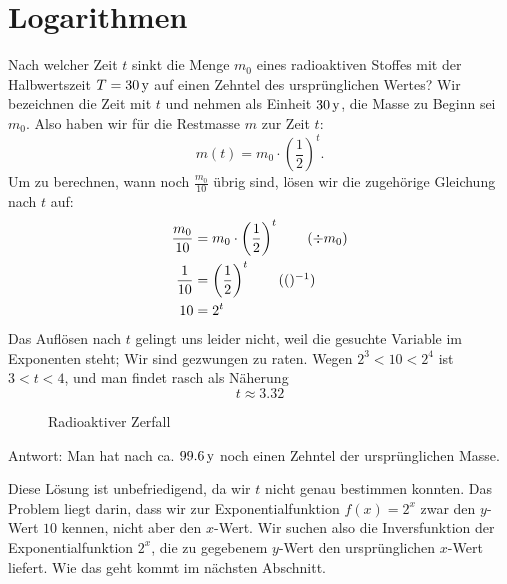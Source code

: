\documentclass[%
11pt,%
twoside,%
titlepage,%
german,%
headsepline%
]{scrartcl}
\begin{document}
\section{Logarithmen}
\begin{bsp}
Nach welcher Zeit $t$ sinkt die Menge $m_0$ eines radioaktiven Stoffes mit der Halbwertszeit $T=\unit[30]{y}$ auf einen Zehntel des ursprünglichen Wertes? Wir bezeichnen die Zeit mit $t$ und nehmen als Einheit $\unit[30]{y}$, die Masse zu Beginn sei $m_0$. Also haben wir für die Restmasse $m$ zur Zeit $t$:
$$m(t)=m_0\cdot\left(\frac{1}{2}\right)^t.$$
Um zu berechnen, wann noch $\frac{m_0}{10}$ übrig sind, lösen wir die zugehörige Gleichung nach $t$ auf:
    \begin{align*}
    \frac{m_0}{10}&=m_0\cdot\left(\frac{1}{2}\right)^t\tag{$\div m_0$}\\
    \frac{1}{10}&=\left(\frac{1}{2}\right)^t\tag{$()^{-1}$}\\
    10&=2^t
    \end{align*}
    Das Auflösen nach $t$ gelingt uns leider nicht, weil die gesuchte Variable
    im Exponenten steht; Wir sind gezwungen zu raten. Wegen
    $2^3<10<2^4$ ist $3<t<4$, und man findet rasch als Näherung
    $$t\approx3.32$$    
\begin{figure}
\begin{center}
\end{center}
\caption{Radioaktiver Zerfall}\label{zerfall}
\end{figure}
   Antwort: Man hat nach ca. $\unit[99.6]{y}$
    noch einen Zehntel der ursprünglichen Masse.
    \end{bsp}
  Diese Lösung ist unbefriedigend, da wir $t$ nicht genau bestimmen
  konnten. Das Problem liegt darin, dass wir zur Exponentialfunktion $f(x)=2^x$ zwar den $y$-Wert $10$ kennen, nicht aber den $x$-Wert. Wir suchen also die Inversfunktion der Exponentialfunktion $2^x$, die zu gegebenem $y$-Wert den ursprünglichen $x$-Wert liefert. Wie das geht kommt im nächsten Abschnitt.
  
\end{document}
